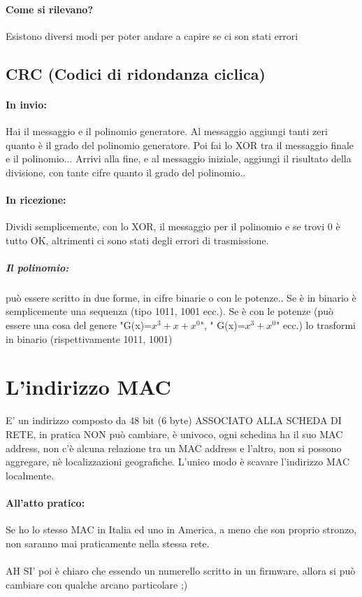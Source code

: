 \documentclass[12pt, a4paper, openany, twoside]{book}
\begin{document}
\paragraph{Come si rilevano? }Esistono diversi modi per poter andare a capire
se ci son stati errori 
\subsection{CRC (Codici di ridondanza ciclica)}
\paragraph{In invio: }
Hai il messaggio e il polinomio generatore. Al messaggio aggiungi tanti zeri 
quanto è il grado del polinomio generatore. Poi fai lo XOR tra il messaggio 
finale e il polinomio... Arrivi alla fine, e al messaggio iniziale, aggiungi 
il risultato della divisione, con tante cifre quanto il grado del polinomio..

\paragraph{In ricezione: }
Dividi semplicemente, con lo XOR, il messaggio per il polinomio e se trovi 0 è 
tutto OK, altrimenti ci sono stati degli errori di trasmissione.

\subparagraph{Il polinomio: } può essere scritto in due forme, 
in cifre binarie o con le potenze.. Se è in binario è semplicemente una sequenza
(tipo 1011, 1001 ecc.). Se è con le potenze (può essere una cosa del genere
"G(x)=$x^{3}+x+x^{0}$", " G(x)=$x^{3}+x^{0}$" ecc.) lo trasformi in binario 
(rispettivamente 1011, 1001)	

\section{L'indirizzo MAC}
E' un indirizzo composto da 48 bit (6 byte) ASSOCIATO ALLA SCHEDA DI RETE, in 
pratica NON può cambiare, è univoco, ogni schedina ha il suo MAC address, non 
c'è alcuna relazione tra un MAC address e l'altro, non si possono aggregare, nè
localizzazioni geografiche. L'unico modo è scavare l'indirizzo MAC localmente.
\paragraph{All'atto pratico: }Se ho lo stesso MAC in Italia ed uno in America,
a meno che son proprio stronzo, non saranno mai praticamente nella stessa rete.\\
\\AH SI' poi è chiaro che essendo un numerello scritto in un firmware, allora si
può cambiare con qualche arcano particolare ;) 
\end{document}
